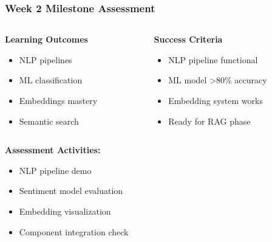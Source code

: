 \begin{frame}[fragile]\frametitle{Week 2 Milestone Assessment}
\begin{columns}
    \begin{column}[T]{0.5\linewidth}
      \textbf{Learning Outcomes}
      \begin{itemize}
        \item NLP pipelines
        \item ML classification
        \item Embeddings mastery
        \item Semantic search
      \end{itemize}
    \end{column}
    \begin{column}[T]{0.5\linewidth}
      \textbf{Success Criteria}
      \begin{itemize}
        \item NLP pipeline functional
        \item ML model >80\% accuracy
        \item Embedding system works
        \item Ready for RAG phase
      \end{itemize}
    \end{column}
  \end{columns}
  
  \vspace{0.3cm}
  \textbf{Assessment Activities:}
  \begin{itemize}
    \item NLP pipeline demo
    \item Sentiment model evaluation
    \item Embedding visualization
    \item Component integration check
  \end{itemize}
\end{frame}

